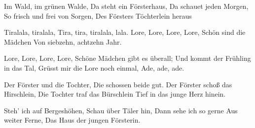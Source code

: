 
\beginverse
Im Wald, im gr\"unen Walde,
Da steht ein F\"orsterhaus,
Da schauet jeden Morgen,
So frisch und frei von Sorgen,
Des F\"orsters Töchterlein heraus
\endverse

\beginchorus
Tiralala, tiralala,
Tira, tira, tiralala, lala.
Lore, Lore, Lore, Lore,
Sch\"on sind die M\"adchen
Von siebzehn, achtzehn Jahr.


Lore, Lore, Lore, Lore,
Sch\"one M\"adchen gibt es \"uberall;
Und kommt der Fr\"uhling in das Tal,
Gr\"usst mir die Lore noch einmal,
Ade, ade, ade.
\endchorus

\beginverse
Der F\"orster und die Tochter,
Die schossen beide gut.
Der F\"orster scho\ss{} das Hirschlein,
Die Tochter traf das B\"urschlein
Tief in das junge Herz hinein.
\endverse

\beginverse
Steh' ich auf Bergesh\"ohen,
Schau \"uber T\"aler hin,
Dann sehe ich so gerne
Aus weiter Ferne,
Das Haus der jungen Försterin.
\endverse

\endsong